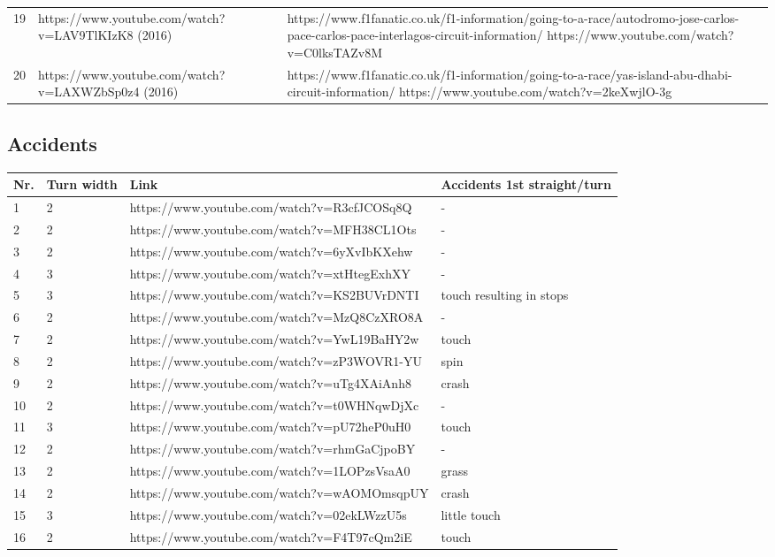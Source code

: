 \documentclass{article}
\begin{document}
\begin{tabularx}{.6\textwidth}{Xll}
19 & https://www.youtube.com/watch?v=LAV9TlKIzK8 (2016) & https://www.f1fanatic.co.uk/f1-information/going-to-a-race/autodromo-jose-carlos-pace-carlos-pace-interlagos-circuit-information/  https://www.youtube.com/watch?v=C0lksTAZv8M \\
20 & https://www.youtube.com/watch?v=LAXWZbSp0z4 (2016) & https://www.f1fanatic.co.uk/f1-information/going-to-a-race/yas-island-abu-dhabi-circuit-information/ https://www.youtube.com/watch?v=2keXwjlO-3g \\
\end{tabularx}

\subsection{Accidents}
\begin{tabular}{llll}
Nr.	& Turn width & Link & Accidents 1st straight/turn \\
\hline
1 & 2 &  https://www.youtube.com/watch?v=R3cfJCOSq8Q & - \\
2 & 2 &  https://www.youtube.com/watch?v=MFH38CL1Ots & - \\
3 & 2 &  https://www.youtube.com/watch?v=6yXvIbKXehw & - \\
4 & 3 &  https://www.youtube.com/watch?v=xtHtegExhXY & - \\
5 & 3 &  https://www.youtube.com/watch?v=KS2BUVrDNTI & touch resulting in stops \\
6 & 2 &  https://www.youtube.com/watch?v=MzQ8CzXRO8A & - \\
7 & 2 &  https://www.youtube.com/watch?v=YwL19BaHY2w & touch \\
8 & 2 &  https://www.youtube.com/watch?v=zP3WOVR1-YU & spin \\
9 & 2 &  https://www.youtube.com/watch?v=uTg4XAiAnh8 & crash \\
10 & 2 &  https://www.youtube.com/watch?v=t0WHNqwDjXc & - \\
11 & 3 &  https://www.youtube.com/watch?v=pU72heP0uH0 & touch \\
12 & 2 &  https://www.youtube.com/watch?v=rhmGaCjpoBY & - \\
13 & 2 &  https://www.youtube.com/watch?v=1LOPzsVsaA0 & grass \\
14 & 2 &  https://www.youtube.com/watch?v=wAOMOmsqpUY & crash \\
15 & 3 &  https://www.youtube.com/watch?v=02ekLWzzU5s & little touch \\
16 & 2 &  https://www.youtube.com/watch?v=F4T97cQm2iE & touch \\
\end{tabular}
\end{document}
